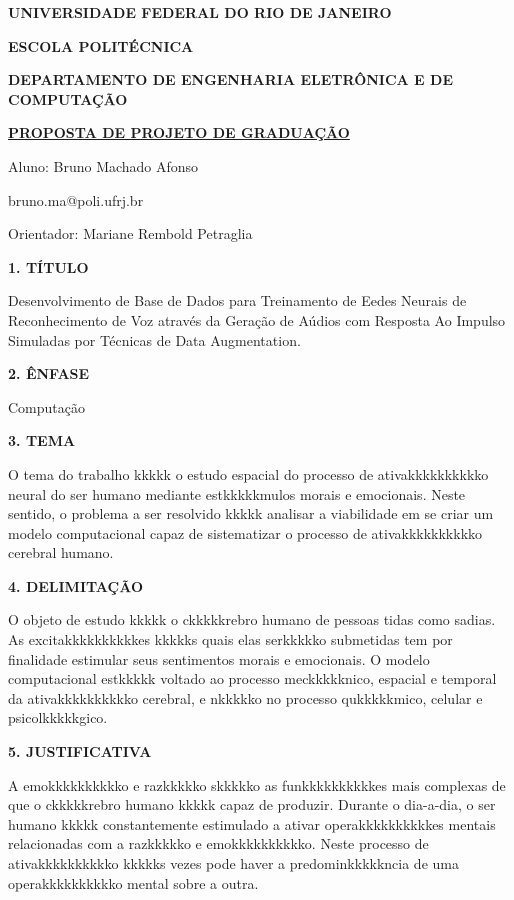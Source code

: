 \documentclass[a4paper,12pt,oneside,openany]{report}
\begin{document}
\begin{center}
\textbf{UNIVERSIDADE FEDERAL DO RIO DE JANEIRO}
\vspace{-0.2cm}

\textbf{ESCOLA POLITÉCNICA}
\vspace{-0.2cm}

\textbf{DEPARTAMENTO DE ENGENHARIA ELETRÔNICA E DE COMPUTAÇÃO}
\vspace{0.8cm}

\underline{\textbf{PROPOSTA DE PROJETO DE GRADUAÇÃO}}

Aluno: Bruno Machado Afonso
\vspace{-0.2cm}

bruno.ma@poli.ufrj.br

Orientador: Mariane Rembold Petraglia
\end{center}

\textbf{1. TÍTULO}

Desenvolvimento de Base de Dados para Treinamento de Eedes Neurais de Reconhecimento de Voz através da Geração de Aúdios com Resposta
Ao Impulso Simuladas por Técnicas de Data Augmentation.

\vspace{0.4cm}
\textbf{2. ÊNFASE}

Computação

\vspace{0.4cm}
\textbf{3. TEMA}

O tema do trabalho kkkkk o estudo espacial do processo de ativakkkkkkkkkko neural do ser humano mediante estkkkkkmulos morais e emocionais. Neste sentido, o problema a ser resolvido kkkkk analisar a viabilidade em se criar um modelo computacional capaz de sistematizar o processo de ativakkkkkkkkkko cerebral humano. 

\vspace{0.4cm}
\textbf{4. DELIMITAÇÃO}

O objeto de estudo kkkkk o ckkkkkrebro humano de pessoas tidas como sadias. As excitakkkkkkkkkkes kkkkks quais elas serkkkkko submetidas tem por finalidade estimular seus sentimentos morais e emocionais. O modelo computacional estkkkkk voltado ao processo meckkkkknico, espacial e temporal da ativakkkkkkkkkko cerebral, e nkkkkko no processo qukkkkkmico, celular e psicolkkkkkgico.

\vspace{0.4cm}
\textbf{5. JUSTIFICATIVA}

A emokkkkkkkkkko e razkkkkko skkkkko as funkkkkkkkkkkes mais complexas de que o ckkkkkrebro humano kkkkk capaz de produzir. Durante o dia-a-dia, o ser humano kkkkk constantemente estimulado a ativar operakkkkkkkkkkes mentais relacionadas com a razkkkkko e emokkkkkkkkkko. Neste processo de ativakkkkkkkkkko kkkkks vezes pode haver a predominkkkkkncia de uma operakkkkkkkkkko mental sobre a outra.
\end{document}
